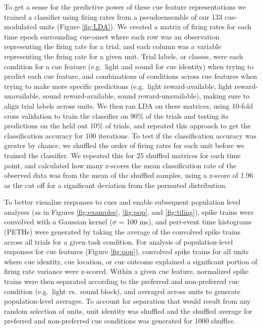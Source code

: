 \documentclass[11pt]{article}
\begin{document}
To get a sense for the predictive power of these cue feature representations we trained a classifier using firing rates from a pseudoensemble of our 133 cue-modulated units (Figure \ref{fig:LDA}). We created a matrix of firing rates for each time epoch surrounding cue-onset where each row was an observation representing the firing rate for a trial, and each column was a variable representing the firing rate for a given unit. Trial labels, or classes, were each condition for a cue feature (e.g.\ light and sound for cue identity) when trying to predict each cue feature, and combinations of conditions across cue features when trying to make more specific predictions (e.g.\ light reward-available, light reward-unavailable, sound reward-available, sound reward-unavailable), making sure to align trial labels across units. We then ran LDA on these matrices, using 10-fold cross validation to train the classifier on 90\% of the trials and testing its predictions on the held out 10\% of trials, and repeated this approach to get the classification accuracy for 100 iterations. To test if the classification accuracy was greater by chance, we shuffled the order of firing rates for each unit before we trained the classifier. We repeated this for 25 shuffled matrices for each time point, and calculated how many z-scores the mean classification rate of the observed data was from the mean of the shuffled samples, using a z-score of 1.96 as the cut off for a significant deviation from the permuted distribution.

To better visualize responses to cues and enable subsequent population
level analyses (as in Figures \ref{fig:examples}, \ref{fig:pop}, and
\ref{fig:tiling}), spike trains were convolved with a Gaussian kernel
($\sigma$ = 100 ms), and peri-event time histograms (PETHs) were
generated by taking the average of the convolved spike trains across all
trials for a given task condition. For analysis of population-level
responses for cue features (Figure \ref{fig:pop}), convolved spike
trains for all units where cue identity, cue location, or cue outcome
explained a significant portion of firing rate variance were
z-scored. Within a given cue feature, normalized spike trains were
then separated according to the preferred and non-preferred cue
condition (e.g.\ light vs.\ sound block), and averaged across units to
generate population-level averages. To account for separation that
would result from any random selection of units, unit identity was
shuffled and the shuffled average for preferred and non-preferred cue
conditions was generated for 1000 shuffles.
\end{document}
